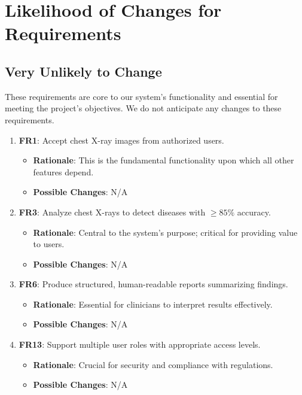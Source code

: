 \documentclass[12pt]{article}
\begin{document}
  
\clearpage
\section{Likelihood of Changes for Requirements}

\subsection{Very Unlikely to Change}

These requirements are core to our system's functionality and essential for meeting the project's objectives. We do not anticipate any changes to these requirements.

\begin{enumerate}
    \item \textbf{FR1}: Accept chest X-ray images from authorized users.
    \begin{itemize}[label=-]
        \item \textbf{Rationale}: This is the fundamental functionality upon which all other features depend.
        \item \textbf{Possible Changes}: N/A
    \end{itemize}

    \item \textbf{FR3}: Analyze chest X-rays to detect diseases with $\geq85\%$ accuracy.
    \begin{itemize}[label=-]
        \item \textbf{Rationale}: Central to the system's purpose; critical for providing value to users.
        \item \textbf{Possible Changes}: N/A
    \end{itemize}

    \item \textbf{FR6}: Produce structured, human-readable reports summarizing findings.
    \begin{itemize}[label=-]
        \item \textbf{Rationale}: Essential for clinicians to interpret results effectively.
        \item \textbf{Possible Changes}: N/A
    \end{itemize}

    \item \textbf{FR13}: Support multiple user roles with appropriate access levels.
    \begin{itemize}[label=-]
        \item \textbf{Rationale}: Crucial for security and compliance with regulations.
        \item \textbf{Possible Changes}: N/A
    \end{itemize}


\end{enumerate}
\end{document}
